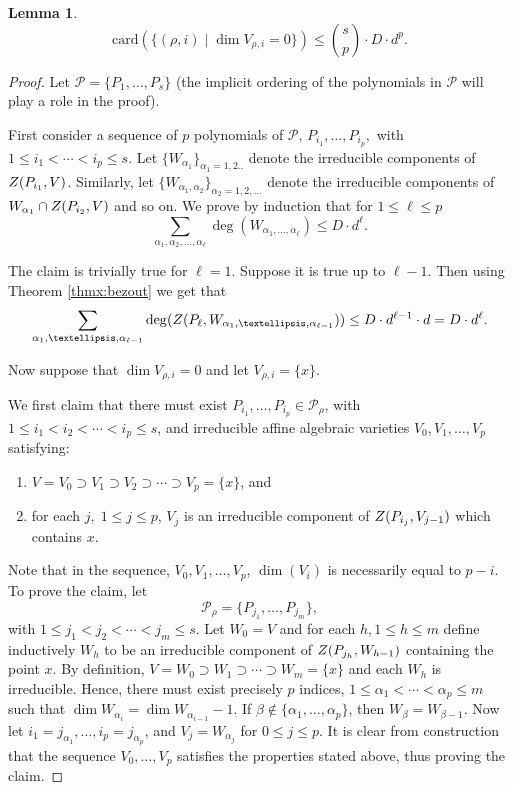 \documentclass[10pt]{amsart}
\newtheorem{lemma}{Lemma}[section]
\theoremstyle{definition}
\theoremstyle{remark}
\numberwithin{equation}{section}
\newcommand {\ZZ} {{\rm Z}}
\newcommand{\card}{\mathrm{card}}
\begin{document}
\begin{lemma}
\label{lem:isolatedpoints}
\[
\card(\{(\rho,i) \mid \dim V_{\rho,i} = 0\}) \leq \binom{s}{p} \cdot  D \cdot d^p.
\]
\end{lemma}

\begin{proof}
Let ${\mathcal P} = \{P_1,\ldots,P_s\}$ (the implicit ordering of
the polynomials in ${\mathcal P}$ will play a role in the proof).


First consider a sequence of $p$ polynomials of ${\mathcal P}$, 
$P_{i_1},\ldots,P_{i_p},$ with
$1 \leq i_1 <  \cdots <  i_p \leq s$.
Let $\{W_{\alpha_1}\}_{\alpha_1 = 1,2..}$ denote the irreducible
components of $\ZZ(P_{i_1},V)$. Similarly, let
$\{W_{\alpha_1,\alpha_2}\}_{\alpha_2 = 1,2,\ldots}$ denote the 
irreducible components  of $W_{\alpha_1} \cap \ZZ(P_{i_2},V)$ and so on.
We prove by induction that for $1 \leq \ell \leq p$
\begin{equation}
\label{eqn:bound}
\sum_{\alpha_1,\alpha_2,\ldots,\alpha_\ell} \deg(W_{\alpha_1,\ldots,\alpha_\ell}) \leq D \cdot d^\ell.
\end{equation}

The claim is trivially true for $\ell=1$. Suppose it is true up to $\ell -1 $.
Then using Theorem \ref{thmx:bezout} we get that
\[
\sum_{\alpha_1,\ldots,\alpha_{\ell-1}}
 \deg(\ZZ(P_\ell,W_{\alpha_1,\ldots,\alpha_{\ell-1}}))  
 \leq D \cdot d^{\ell-1}\cdot d = D \cdot d^\ell.
\]

Now suppose that $\dim V_{\rho,i} = 0$ and let $V_{\rho,i} = \{x\}$.

We first claim that
there must exist $P_{i_1},\ldots,P_{i_p} \in {\mathcal P}_{\rho}$, with
$1 \leq i_1 < i_2 < \cdots < i_p \leq s$,  and
irreducible affine algebraic varieties 
$V_0, V_1,\ldots,V_p$ satisfying:
\begin{enumerate}
\item
$V= V_0 \supset V_1 \supset V_2 \supset \cdots \supset V_p = \{x\}$, and
\item
for each $j, \;1 \leq j \leq p$,
$V_{j}$ is an irreducible component of $\ZZ(P_{i_j},V_{j-1})$
which contains $x$.
\end{enumerate} 
Note that in the sequence, $V_0,V_1,\ldots,V_p$,
$\dim (V_i)$ is necessarily  equal to $p-i$.
To prove the claim, let 
\[
{\mathcal P}_\rho = \{P_{j_1},\ldots,P_{j_m}\},
\]
with $1 \leq j_1 < j_2 < \cdots < j_m \leq s$.
Let $W_0 = V$ and
for each $h, 1 \leq  h \leq m$ define inductively
$W_{h}$ to be an irreducible component of $\ZZ(P_{j_h},W_{h-1})$
containing the point $x$. By definition,
$V = W_0 \supset W_1 \supset \cdots \supset W_m = \{x\}$ and each
$W_h$ is irreducible. Hence, there must exist precisely
$p$ indices,
$1 \leq \alpha_1 < \cdots < \alpha_p \leq m$ such that
$\dim W_{\alpha_{i}} = \dim  W_{\alpha_{i-1}} - 1$.
If $\beta \not\in \{\alpha_1,\ldots,\alpha_p\}$, then
$W_{\beta} = W_{\beta - 1}$.
Now let $i_1 = j_{\alpha_1},\ldots, i_p = j_{\alpha_p}$,
and $V_j = W_{\alpha_j}$ for $0 \leq j \leq p$. It is clear from construction
that the sequence $V_0,\ldots,V_p$ satisfies the properties stated above,
thus proving the claim.
 

\end{proof}
\end{document}
